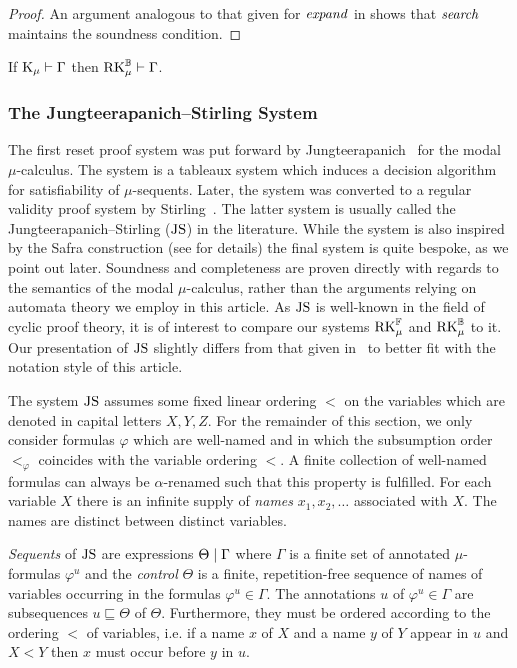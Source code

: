 \begin{proof}
  An argument analogous to that given for $\mathit{expand}$ in  shows that
$\mathit{search}$ maintains the soundness condition.
\end{proof}

\begin{corollary}[Completeness]\label{lem:ra-complete}
  If $\mathrm{K}_\mu \vdash \Gamma$ then $\mathrm{RK}_\mu^{\mathbb{B}} \vdash
  \Gamma$.
\end{corollary}

\subsubsection{The Jungteerapanich--Stirling System}
\label{sec:js}

The first reset proof system was put forward by
Jungteerapanich~\parencite{jungteerapanichTableauSystemsModal2010} for the modal
$\mu$-calculus. The system is a tableaux system which induces a decision
algorithm for satisfiability of $\mu$-sequents. Later, the system was converted
to a regular validity proof system by
Stirling~\parencite{stirlingProofSystemNames2013}. The latter system is usually
called the Jungteerapanich--Stirling ($\mathrm{JS}$) in the literature. While the system
is also inspired by the Safra construction (see \parencite[Section
4.3.5]{jungteerapanichTableauSystemsModal2010} for details) the final system
is quite bespoke, as we point out later. Soundness and completeness are
proven directly with regards to the semantics of the modal $\mu$-calculus,
rather than the arguments relying on automata theory we employ in this article.
As $\mathrm{JS}$ is well-known in the field of cyclic proof theory, it is of interest to
compare our systems $\mathrm{RK}_\mu^{\mathbb{F}}$ and $\mathrm{RK}_\mu^{\mathbb{B}}$ to it. Our presentation of $\mathrm{JS}$
slightly differs from that given in~\parencite{stirlingProofSystemNames2013} to
better fit with the notation style of this article.

The system $\mathrm{JS}$ assumes some fixed linear ordering $<$ on the variables which
are denoted in capital letters $X, Y, Z$. For the remainder of this section, we
only consider formulas $\varphi$ which are well-named and in which the
subsumption order $<_\varphi$ coincides with the variable ordering $<$. A finite
collection of well-named formulas can always be $\alpha$-renamed such that this
property is fulfilled.
For each variable $X$ there is an infinite supply of
\emph{names} $x_1, x_2, \ldots$ associated with $X$. The names are distinct
between distinct variables.

\emph{Sequents} of $\mathrm{JS}$ are expressions $\Theta \mid \Gamma$ where $\Gamma$ is
a finite set of annotated $\mu$-formulas $\varphi^u$ and the \emph{control} $\Theta$ is a finite,
repetition-free sequence of names of variables occurring in the formulas
$\varphi^u \in \Gamma$. The
annotations $u$ of $\varphi^u \in \Gamma$ are subsequences $u \sqsubseteq
\Theta$ of $\Theta$.
Furthermore, they must be ordered according to the
ordering $<$ of variables, i.e. if a name $x$ of $X$ and a name $y$ of $Y$
appear in $u$ and $X < Y$ then $x$ must occur before $y$ in $u$.

